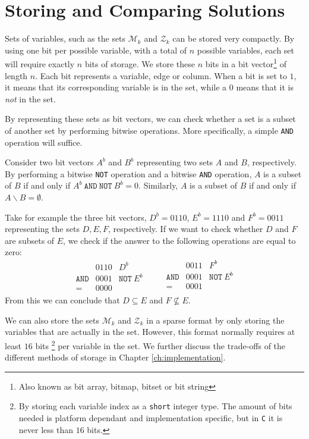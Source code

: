 \section{Storing and Comparing Solutions}
Sets of variables, such as the sets $\mathcal{M}_k$ and $\mathcal{Z}_k$ can be
stored very compactly.
By using one bit per possible variable, with a total of $n$ possible variables,
each set will require exactly $n$ bits of storage.
We store these $n$ bits in a bit vector\footnote{Also known as bit array,
bitmap, bitset or bit string} of length $n$.
Each bit represents a variable, edge or column.
When a bit is set to $1$, it means that its corresponding variable is in
the set, while a $0$ means that it is \emph{not} in the set.

By representing these sets as bit vectors, we can check whether a set is a
subset of another set by performing bitwise operations. More specifically,
a simple \texttt{AND} operation will suffice.

Consider two bit vectors $A^b$ and $B^b$ representing two sets $A$ and
$B$, respectively.
By performing a bitwise \texttt{NOT} operation and a bitwise \texttt{AND}
operation, $A$ is a subset of $B$ if and only if
$A^b~\texttt{AND}~\texttt{NOT}~B^b = 0$.
Similarly, $A$ is a subset of $B$ if and only if $A \backslash B = \emptyset$.

Take for example the three bit vectors, $D^b = 0110$, $E^b = 1110$ and
$F^b = 0011$ representing the sets $D, E, F$, respectively.
If we want to check whether $D$ and $F$ are subsets of $E$, we check if the
answer to the following operations are equal to zero:
\[
\begin{array}{lrl}
                 & 0110 & D^b \\
    \texttt{AND} & 0001 & \texttt{NOT}~E^b \\ \hline
    =            & 0000
\end{array}
\qquad
\begin{array}{lrl}
                 & 0011 & F^b \\
    \texttt{AND} & 0001 & \texttt{NOT}~E^b \\ \hline
    =            & 0001 \\
\end{array}
\]
From this we can conclude that $D \subseteq E$ and $F \not\subseteq E$.

We can also store the sets $\mathcal{M}_k$ and $\mathcal{Z}_k$ in a sparse
format by only storing the variables that are actually in the set. However,
this format normally requires at least $16$ bits\nolinebreak
\footnote{By storing each variable index as a \texttt{short} integer type.
The amount of bits needed is platform dependant and implementation specific,
but in \texttt{C} it is never less than $16$ bits.}
per variable in the set.
We further discuss the trade-offs of the different methods of storage in
Chapter \ref{ch:implementation}.
